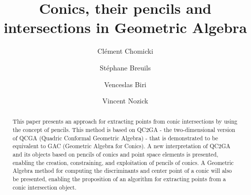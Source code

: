 \documentclass{birkjour}
\begin{document}
\title{Conics, their pencils and intersections in Geometric Algebra}

\author[Chomicki C.]{Cl\'ement Chomicki}
\address{LIGM, Universit\'e Gustave Eiffel, CNRS, France}

\author[Breuils S.]{St\'ephane Breuils}
\address{LAMA, Universit\'e Savoie Mont-Blanc, CNRS, France}

\author[Biri V.]{Venceslas Biri}
\address{LIGM, Universit\'e Gustave Eiffel, CNRS, France}

\author[Nozick V.]{Vincent Nozick}
\address{LIGM, Universit\'e Gustave Eiffel, CNRS, France}

\date{ }%


\newcommand{\qcgaobject}[1]{\overset{\mbox{\tiny QC2GA}}{#1}}
\newcommand{\gacobject}[1]{\overset{\mbox{\tiny GAC}}{#1}}
\newcommand{\gavec}[3][e]{\({#1_{#2_{#3}}}\)}
\newcommand{\forcenumbering}{(\refstepcounter{equation}\theequation)}

\begin{abstract}
This paper presents an approach for extracting points from conic intersections by using the concept of pencils. This method is based on QC2GA - the two-dimensional version of QCGA (Quadric Conformal Geometric Algebra) - that is demonstrated to be equivalent to GAC (Geometric Algebra for Conics). A new interpretation of QC2GA and its objects based on pencils of conics and point space elements is presented, enabling the creation, constraining, and exploitation of pencils of conics. A Geometric Algebra method for computing the discriminants and center point of a conic will also be presented, enabling the proposition of an algorithm for extracting points from a conic intersection object.
\end{abstract}
\end{document}
